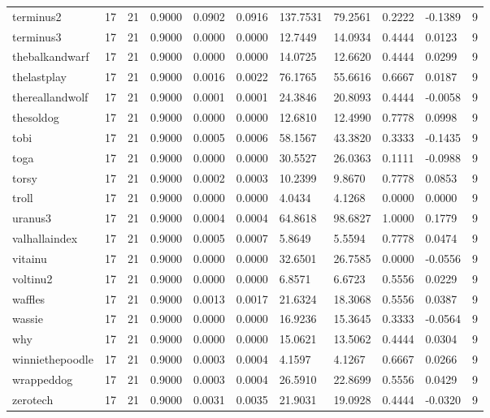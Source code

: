 \begin{table}[htbp]
\begin{tabular}{lllllllllll}
terminus2 & 17 & 21 & 0.9000 & 0.0902 & 0.0916 & 137.7531 & 79.2561 & 0.2222 & -0.1389 & 9 \\
terminus3 & 17 & 21 & 0.9000 & 0.0000 & 0.0000 & 12.7449 & 14.0934 & 0.4444 & 0.0123 & 9 \\
thebalkandwarf & 17 & 21 & 0.9000 & 0.0000 & 0.0000 & 14.0725 & 12.6620 & 0.4444 & 0.0299 & 9 \\
thelastplay & 17 & 21 & 0.9000 & 0.0016 & 0.0022 & 76.1765 & 55.6616 & 0.6667 & 0.0187 & 9 \\
thereallandwolf & 17 & 21 & 0.9000 & 0.0001 & 0.0001 & 24.3846 & 20.8093 & 0.4444 & -0.0058 & 9 \\
thesoldog & 17 & 21 & 0.9000 & 0.0000 & 0.0000 & 12.6810 & 12.4990 & 0.7778 & 0.0998 & 9 \\
tobi & 17 & 21 & 0.9000 & 0.0005 & 0.0006 & 58.1567 & 43.3820 & 0.3333 & -0.1435 & 9 \\
toga & 17 & 21 & 0.9000 & 0.0000 & 0.0000 & 30.5527 & 26.0363 & 0.1111 & -0.0988 & 9 \\
torsy & 17 & 21 & 0.9000 & 0.0002 & 0.0003 & 10.2399 & 9.8670 & 0.7778 & 0.0853 & 9 \\
troll & 17 & 21 & 0.9000 & 0.0000 & 0.0000 & 4.0434 & 4.1268 & 0.0000 & 0.0000 & 9 \\
uranus3 & 17 & 21 & 0.9000 & 0.0004 & 0.0004 & 64.8618 & 98.6827 & 1.0000 & 0.1779 & 9 \\
valhallaindex & 17 & 21 & 0.9000 & 0.0005 & 0.0007 & 5.8649 & 5.5594 & 0.7778 & 0.0474 & 9 \\
vitainu & 17 & 21 & 0.9000 & 0.0000 & 0.0000 & 32.6501 & 26.7585 & 0.0000 & -0.0556 & 9 \\
voltinu2 & 17 & 21 & 0.9000 & 0.0000 & 0.0000 & 6.8571 & 6.6723 & 0.5556 & 0.0229 & 9 \\
waffles & 17 & 21 & 0.9000 & 0.0013 & 0.0017 & 21.6324 & 18.3068 & 0.5556 & 0.0387 & 9 \\
wassie & 17 & 21 & 0.9000 & 0.0000 & 0.0000 & 16.9236 & 15.3645 & 0.3333 & -0.0564 & 9 \\
why & 17 & 21 & 0.9000 & 0.0000 & 0.0000 & 15.0621 & 13.5062 & 0.4444 & 0.0304 & 9 \\
winniethepoodle & 17 & 21 & 0.9000 & 0.0003 & 0.0004 & 4.1597 & 4.1267 & 0.6667 & 0.0266 & 9 \\
wrappeddog & 17 & 21 & 0.9000 & 0.0003 & 0.0004 & 26.5910 & 22.8699 & 0.5556 & 0.0429 & 9 \\
zerotech & 17 & 21 & 0.9000 & 0.0031 & 0.0035 & 21.9031 & 19.0928 & 0.4444 & -0.0320 & 9 \\

\end{tabular}
\end{table}
